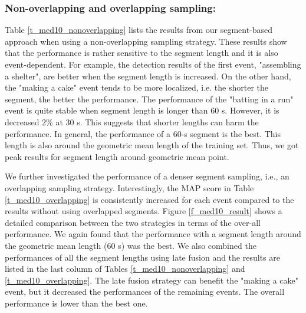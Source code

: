 \subsubsection{Non-overlapping and overlapping sampling:}\label{experimentalresult:1} Table \ref{t_med10_nonoverlapping} lists the results from our segment-based approach when using a non-overlapping sampling strategy. These results show that the performance is rather sensitive to the segment length and it is also event-dependent. For example, the detection results of the first event, "assembling a shelter", are better when the segment length is increased. On the other hand, the "making a cake" event tends to be more localized, i.e. the shorter the segment, the better the performance. The performance of the "batting in a run" event is quite stable when segment length is longer than 60 s. However, it is decreased 2\% at 30 s. This suggests that shorter lengths can harm the performance. In general, the performance of a 60-s segment is the best. This length is also around the geometric mean length of the training set. Thus, we got peak results for segment length around geometric mean point. 

We further investigated the performance of a denser segment sampling, i.e., an overlapping sampling strategy. Interestingly, the MAP score in Table \ref{t_med10_overlapping} is consistently increased for each event compared to the results without using overlapped segments. Figure \ref{f_med10_result} shows a detailed comparison between the two strategies in terms of the over-all performance. We again found that the performance with a segment length around the geometric mean length (60 s) was the best. We also combined the performances of all the segment lengths using late fusion and the results are listed in the last column of Tables \ref{t_med10_nonoverlapping} and \ref{t_med10_overlapping}. The late fusion strategy can benefit the "making a cake" event, but it decreased the performances of the remaining events. The overall performance is lower than the best one.

